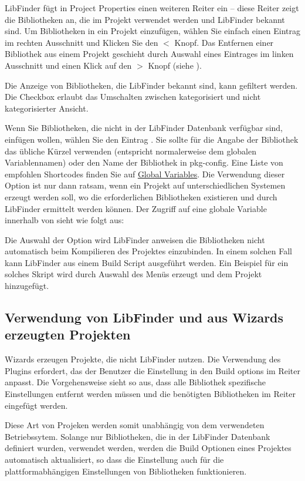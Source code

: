 LibFinder fügt in Project Properties einen weiteren Reiter  ein -- diese Reiter zeigt die Bibliotheken an, die im Projekt verwendet werden und LibFinder bekannt sind. Um Bibliotheken in ein Projekt einzufügen, wählen Sie einfach einen Eintrag im rechten Ausschnitt und Klicken Sie den $<$ Knopf. Das Entfernen einer Bibliothek aus einem Projekt geschieht durch Auswahl eines Eintrages im linken Ausschnitt und einen Klick auf den $>$ Knopf (siehe ).


Die Anzeige von Bibliotheken, die LibFinder bekannt sind, kann gefiltert werden. Die Checkbox  erlaubt das Umschalten zwischen kategorisiert und nicht kategorisierter Ansicht.

Wenn Sie Bibliotheken, die nicht in der LibFinder Datenbank verfügbar sind, einfügen wollen, wählen Sie den Eintrag . Sie sollte für die Angabe der Bibliothek das übliche Kürzel verwenden (entspricht normalerweise dem globalen Variablennamen) oder den Name der Bibliothek in pkg-config. Eine Liste von empfohlen Shortcodes finden Sie auf \href{http://wiki.codeblocks.org/index.php?title=Recommended_global_variables}{Global Variables}. Die Verwendung dieser Option ist nur dann ratsam, wenn ein Projekt auf unterschiedlichen Systemen erzeugt werden soll, wo die erforderlichen Bibliotheken existieren und durch LibFinder ermittelt werden können. Der Zugriff auf eine globale Variable innerhalb von \codeblocks sieht wie folgt aus:


Die Auswahl der Option  wird LibFinder anweisen die Bibliotheken nicht automatisch beim Kompilieren des Projektes einzubinden. In einem solchen Fall kann LibFinder aus einem Build Script ausgeführt werden. Ein Beispiel für ein solches Skript wird durch Auswahl des Menüs  erzeugt und dem Projekt hinzugefügt.

\subsection{Verwendung von LibFinder und aus Wizards erzeugten Projekten}

Wizards erzeugen Projekte, die nicht LibFinder nutzen. Die Verwendung des Plugins erfordert, das der Benutzer die Einstellung in den Build options im Reiter  anpasst. Die Vorgehensweise sieht so aus, dass alle Bibliothek spezifische Einstellungen entfernt werden müssen und die benötigten Bibliotheken im Reiter  eingefügt werden.

Diese Art von Projeken werden somit unabhängig von dem verwendeten Betriebssytem. Solange nur Bibliotheken, die in der LibFinder Datenbank definiert wurden, verwendet werden, werden die Build Optionen eines Projektes automatisch aktualisiert, so dass die Einstellung auch für die plattformabhängigen Einstellungen von Bibliotheken funktionieren.
